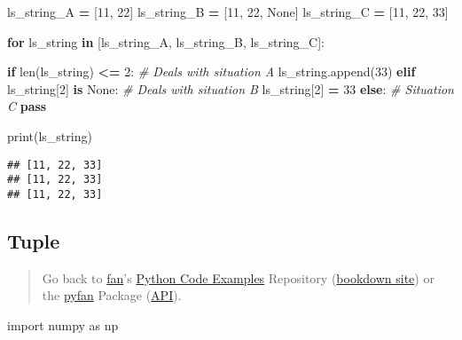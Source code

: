 \documentclass[
]{book}
\newenvironment{Shaded}{\begin{snugshade}}{\end{snugshade}}
\newcommand{\BuiltInTok}[1]{#1}
\newcommand{\CommentTok}[1]{\textcolor[rgb]{0.56,0.35,0.01}{\textit{#1}}}
\newcommand{\ControlFlowTok}[1]{\textcolor[rgb]{0.13,0.29,0.53}{\textbf{#1}}}
\newcommand{\DecValTok}[1]{\textcolor[rgb]{0.00,0.00,0.81}{#1}}
\newcommand{\ImportTok}[1]{#1}
\newcommand{\KeywordTok}[1]{\textcolor[rgb]{0.13,0.29,0.53}{\textbf{#1}}}
\newcommand{\NormalTok}[1]{#1}
\newcommand{\OperatorTok}[1]{\textcolor[rgb]{0.81,0.36,0.00}{\textbf{#1}}}
\newcommand{\VariableTok}[1]{\textcolor[rgb]{0.00,0.00,0.00}{#1}}
\begin{document}
\begin{Shaded}
\begin{Highlighting}[]

\NormalTok{ls\_string\_A }\OperatorTok{=}\NormalTok{ [}\DecValTok{11}\NormalTok{, }\DecValTok{22}\NormalTok{]}
\NormalTok{ls\_string\_B }\OperatorTok{=}\NormalTok{ [}\DecValTok{11}\NormalTok{, }\DecValTok{22}\NormalTok{, }\VariableTok{None}\NormalTok{]}
\NormalTok{ls\_string\_C }\OperatorTok{=}\NormalTok{ [}\DecValTok{11}\NormalTok{, }\DecValTok{22}\NormalTok{, }\DecValTok{33}\NormalTok{]}

\ControlFlowTok{for}\NormalTok{ ls\_string }\KeywordTok{in}\NormalTok{ [ls\_string\_A, ls\_string\_B, ls\_string\_C]:}

  \ControlFlowTok{if} \BuiltInTok{len}\NormalTok{(ls\_string) }\OperatorTok{\textless{}=} \DecValTok{2}\NormalTok{:}
    \CommentTok{\# Deals with situation A}
\NormalTok{    ls\_string.append(}\DecValTok{33}\NormalTok{)}
  \ControlFlowTok{elif}\NormalTok{ ls\_string[}\DecValTok{2}\NormalTok{] }\KeywordTok{is} \VariableTok{None}\NormalTok{:}
    \CommentTok{\# Deals with situation B}
\NormalTok{    ls\_string[}\DecValTok{2}\NormalTok{] }\OperatorTok{=} \DecValTok{33}
  \ControlFlowTok{else}\NormalTok{:}
    \CommentTok{\# Situation C}
    \ControlFlowTok{pass}

  \BuiltInTok{print}\NormalTok{(ls\_string)}
\end{Highlighting}
\end{Shaded}

\begin{verbatim}
## [11, 22, 33]
## [11, 22, 33]
## [11, 22, 33]
\end{verbatim}

\hypertarget{tuple}{%
\subsection{Tuple}\label{tuple}}

\begin{quote}
Go back to \href{http://fanwangecon.github.io/}{fan}'s \href{https://fanwangecon.github.io/Py4Econ/}{Python Code Examples} Repository (\href{https://fanwangecon.github.io/Py4Econ/bookdown}{bookdown site}) or the \href{https://pyfan.readthedocs.io/en/latest/}{pyfan} Package (\href{https://pyfan.readthedocs.io/en/latest/reference.html}{API}).
\end{quote}

\begin{Shaded}
\begin{Highlighting}[]
\ImportTok{import}\NormalTok{ numpy }\ImportTok{as}\NormalTok{ np}
\end{Highlighting}
\end{Shaded}
\end{document}
